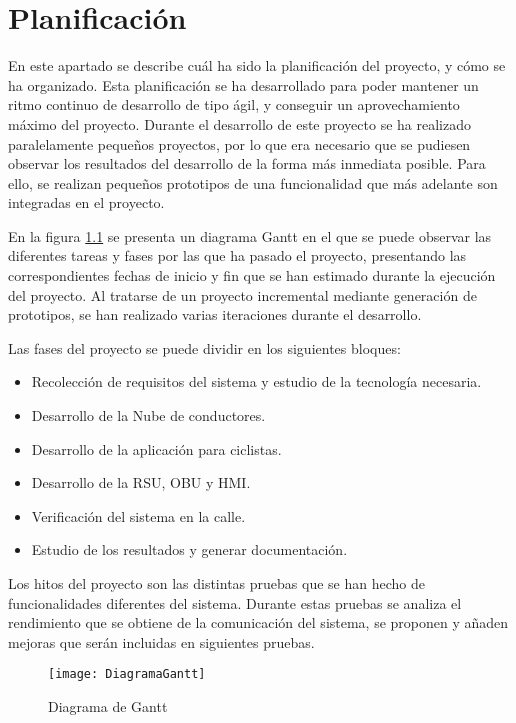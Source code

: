 \chapter{Planificación}
En este apartado se describe cuál ha sido la planificación del proyecto, y cómo se ha organizado. Esta planificación se ha desarrollado para poder mantener un ritmo continuo de desarrollo de tipo ágil, y conseguir un aprovechamiento máximo del proyecto. Durante el desarrollo de este proyecto se ha realizado paralelamente pequeños proyectos, por lo que era necesario que se pudiesen observar los resultados del desarrollo de la forma más inmediata posible. Para ello, se realizan pequeños prototipos de una funcionalidad que más adelante son integradas en el proyecto.

En la figura \ref{fig:gantt} se presenta un diagrama Gantt en el que se puede observar las diferentes tareas y fases por las que ha pasado el proyecto, presentando las correspondientes fechas de inicio y fin que se han estimado durante la ejecución del proyecto. Al tratarse de un proyecto incremental mediante generación de prototipos, se han realizado varias iteraciones durante el desarrollo.

Las fases del proyecto se puede dividir en los siguientes bloques:
\begin{itemize}
	\item Recolección de requisitos del sistema y estudio de la tecnología necesaria.
	
	\item Desarrollo de la Nube de conductores.
	
	\item Desarrollo de la aplicación para ciclistas.
	
	\item Desarrollo de la RSU, OBU y HMI.
	
	\item Verificación del sistema en la calle.
	
	\item Estudio de los resultados y generar documentación.
\end{itemize}

Los hitos del proyecto son las distintas pruebas que se han hecho de funcionalidades
diferentes del sistema. Durante estas pruebas se analiza el rendimiento que se obtiene
de la comunicación del sistema, se proponen y añaden mejoras que serán incluidas en
siguientes pruebas.

\begin{figure}[t]
	 {
		\texttt{[image: DiagramaGantt]}
	}
	\caption{Diagrama de Gantt}
	\label{fig:gantt}
\end{figure}
